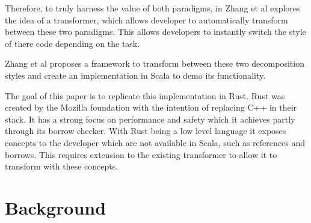 \documentclass[ oneside,%
                    author={James Elgar},
                    degree={MEng},
                     title={Bidirectional transformer between functional and \\ object-oriented programming in Rust},
                  subtitle={}]{dissertation}
\newcommand{\weixin}{Zhang et al }
\begin{document}
Therefore, to truly harness the value of both paradigms, in \cite{food} \weixin explores the idea of a transformer, which allows developer to automatically transform between these two paradigms. This allows developers to instantly switch the style of there code depending on the task.

\weixin proposes a framework to transform between these two decomposition styles and create an implementation in Scala to demo its functionality.

The goal of this paper is to replicate this implementation in Rust. Rust was created by the Mozilla foundation with the intention of replacing C++ in their stack. It has a strong focus on performance and safety which it achieves partly through its borrow checker. With Rust being a low level language it exposes concepts to the developer which are not available in Scala, such as references and borrows. This requires extension to the existing transformer to allow it to transform with these concepts. 






\chapter{Background}
\label{chap:technical}
\end{document}
